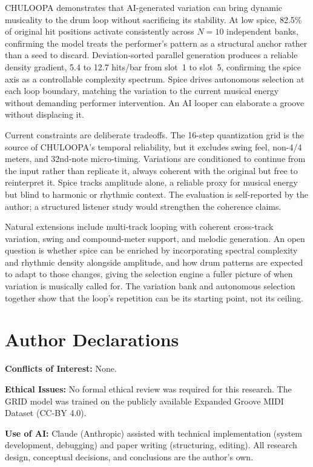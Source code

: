 \documentclass{aimc2026}
\begin{document}
CHULOOPA demonstrates that AI-generated variation can bring dynamic musicality to the drum loop without sacrificing its stability. At low spice, 82.5\% of original hit positions activate consistently across $N{=}10$ independent banks, confirming the model treats the performer's pattern as a structural anchor rather than a seed to discard. Deviation-sorted parallel generation produces a reliable density gradient, 5.4 to 12.7 hits/bar from slot~1 to slot~5, confirming the spice axis as a controllable complexity spectrum. Spice drives autonomous selection at each loop boundary, matching the variation to the current musical energy without demanding performer intervention. An AI looper can elaborate a groove without displacing it.

Current constraints are deliberate tradeoffs. The 16-step quantization grid is the source of CHULOOPA's temporal reliability, but it excludes swing feel, non-4/4 meters, and 32nd-note micro-timing. Variations are conditioned to continue from the input rather than replicate it, always coherent with the original but free to reinterpret it. Spice tracks amplitude alone, a reliable proxy for musical energy but blind to harmonic or rhythmic context. The evaluation is self-reported by the author; a structured listener study would strengthen the coherence claims.

Natural extensions include multi-track looping with coherent cross-track variation, swing and compound-meter support, and melodic generation. An open question is whether spice can be enriched by incorporating spectral complexity and rhythmic density alongside amplitude, and how drum patterns are expected to adapt to those changes, giving the selection engine a fuller picture of when variation is musically called for. The variation bank and autonomous selection together show that the loop's repetition can be its starting point, not its ceiling.

\section*{Author Declarations}

\textbf{Conflicts of Interest:} None.

\textbf{Ethical Issues:} No formal ethical review was required for this research. The GRID model was trained on the publicly available Expanded Groove MIDI Dataset (CC-BY 4.0).

\textbf{Use of AI:} Claude (Anthropic) assisted with technical implementation (system development, debugging) and paper writing (structuring, editing). All research design, conceptual decisions, and conclusions are the author's own. 





\end{document}
